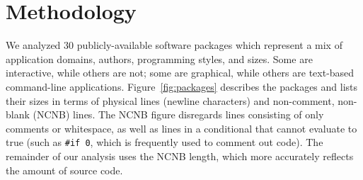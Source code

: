 \documentclass[10pt]{article}
\def\numpackages{30}
\begin{document}



%

%
%
%






\section{Methodology}
\label{sec:methodology}

We analyzed {\numpackages} publicly-available software packages which
represent a mix of application domains, authors, programming styles, and
sizes.  Some are interactive, while others are not; some are graphical,
while others are text-based command-line applications.
Figure~\ref{fig:packages} describes the packages and lists their sizes in
terms of physical lines (newline characters) and non-comment, non-blank
(NCNB) lines.  The NCNB figure disregards lines consisting of only comments
or whitespace, as well as lines in a conditional that cannot evaluate to
true (such as {\tt \#if 0}, which is frequently used to comment out code).
The remainder of our analysis uses the NCNB length, which more accurately
reflects the amount of source code.
\end{document}
